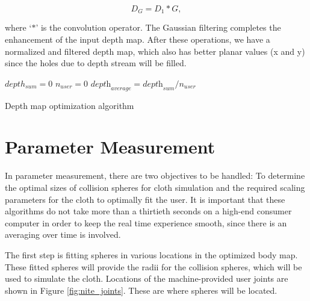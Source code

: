\begin{equation}
D_G=D_1*G,
\label{eqn:gaussian_convolution}
\end{equation}

\noindent where `$*$' is the convolution operator. The Gaussian filtering completes the enhancement of the input depth map. 
After these operations, we have a normalized and filtered depth map, which also has better planar values (x and y) since the holes due to depth stream will be filled.

\begin{algorithm}[ht]
\DontPrintSemicolon %
$depth_{sum}=0$ \;
$n_{user} =0$\;
$\textit{depth}_\textit{average}=\textit{depth}_\textit{sum}/n_\textit{user}$ \;
 
\caption{Depth map optimization algorithm}
\label{algo:depth_patch}
\end{algorithm}

\section{Parameter Measurement}
In parameter measurement, there are two objectives to be handled: To determine the optimal sizes of collision spheres for cloth simulation and the required scaling parameters for the cloth to optimally fit the user. It is important that these algorithms do not take more than a thirtieth seconds on a high-end consumer computer in order to keep the real time experience smooth, since there is an averaging over time is involved.

The first step is fitting spheres in various locations in the optimized body map. These fitted spheres will provide the radii for the collision spheres, which will be used to simulate the cloth. Locations of the machine-provided user joints are shown in Figure \ref{fig:nite_joints}. These are where spheres will be located.


